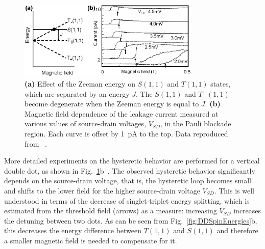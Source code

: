 \documentclass[rmp,twocolumn,aps]{revtex4}
\begin{document}
\begin{figure}[tb]
\includegraphics[width=3.4in, clip=true]{hanson_fig37.eps}
\caption{\textbf{(a)} Effect of the Zeeman energy on $S(1,1)$ and $T(1,1)$ states,
which are separated by an energy $J$. The $S(1,1)$ and
$T_-(1,1)$ become degenerate when the Zeeman energy is
equal to $J$. \textbf{(b)} Magnetic field
dependence of the leakage current measured at various values of
source-drain voltages, $V_{SD}$, in the Pauli blockade region. Each
curve is offset by 1~pA to the top. Data reproduced from
~\textcite{Tarucha06}.} \label{Fig:DDOno2}
\end{figure}

More detailed experiments on the hysteretic behavior are performed
for a vertical double dot, as shown in
Fig.~\ref{Fig:DDOno2}b~\cite{Tarucha06}. The observed hysteretic
behavior significantly depends on the source-drain voltage, that
is, the hysteretic loop becomes small and shifts to the lower
field for the higher source-drain voltage $V_{SD}$. This is well
understood in terms of the decrease of singlet-triplet energy splitting, which is
estimated from the threshold field (arrows) as a measure:
increasing $V_{SD}$ increases the detuning between two
dots. As can be seen from Fig.~\ref{fig:DDSpinEnergies}b, this decreases the energy difference between $T(1,1)$ and $S(1,1)$ and therefore a smaller magnetic field is needed to compensate for it.
\end{document}
